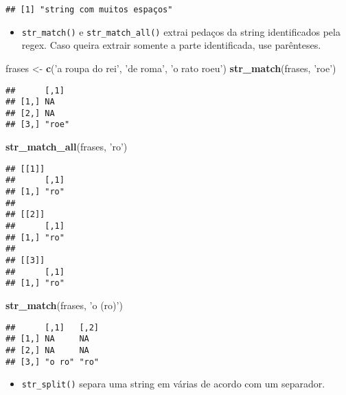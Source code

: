 \documentclass[]{book}
\newenvironment{Shaded}{\begin{snugshade}}{\end{snugshade}}
\newcommand{\KeywordTok}[1]{\textcolor[rgb]{0.13,0.29,0.53}{\textbf{{#1}}}}
\newcommand{\StringTok}[1]{\textcolor[rgb]{0.31,0.60,0.02}{{#1}}}
\newcommand{\NormalTok}[1]{{#1}}
\providecommand{\tightlist}{%
  \setlength{\itemsep}{0pt}\setlength{\parskip}{0pt}}
\begin{document}
\begin{verbatim}
## [1] "string com muitos espaços"
\end{verbatim}

\begin{itemize}
\tightlist
\item
  \texttt{str\_match()} e \texttt{str\_match\_all()} extrai pedaços da
  string identificados pela regex. Caso queira extrair somente a parte
  identificada, use parênteses.
\end{itemize}

\begin{Shaded}
\begin{Highlighting}[]
\NormalTok{frases <-}\StringTok{ }\KeywordTok{c}\NormalTok{(}\StringTok{'a roupa do rei'}\NormalTok{, }\StringTok{'de roma'}\NormalTok{, }\StringTok{'o rato roeu'}\NormalTok{)}
\KeywordTok{str_match}\NormalTok{(frases, }\StringTok{'roe'}\NormalTok{)}
\end{Highlighting}
\end{Shaded}

\begin{verbatim}
##      [,1] 
## [1,] NA   
## [2,] NA   
## [3,] "roe"
\end{verbatim}

\begin{Shaded}
\begin{Highlighting}[]
\KeywordTok{str_match_all}\NormalTok{(frases, }\StringTok{'ro'}\NormalTok{)}
\end{Highlighting}
\end{Shaded}

\begin{verbatim}
## [[1]]
##      [,1]
## [1,] "ro"
## 
## [[2]]
##      [,1]
## [1,] "ro"
## 
## [[3]]
##      [,1]
## [1,] "ro"
\end{verbatim}

\begin{Shaded}
\begin{Highlighting}[]
\KeywordTok{str_match}\NormalTok{(frases, }\StringTok{'o (ro)'}\NormalTok{)}
\end{Highlighting}
\end{Shaded}

\begin{verbatim}
##      [,1]   [,2]
## [1,] NA     NA  
## [2,] NA     NA  
## [3,] "o ro" "ro"
\end{verbatim}

\begin{itemize}
\tightlist
\item
  \texttt{str\_split()} separa uma string em várias de acordo com um
  separador.
\end{itemize}
\end{document}
